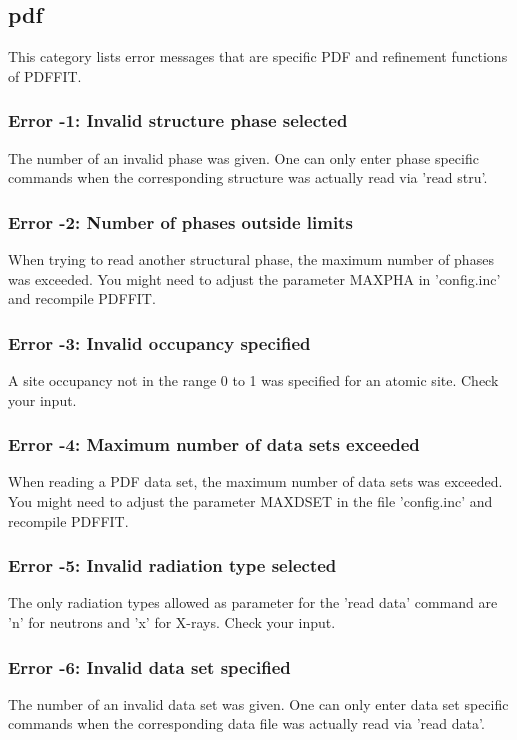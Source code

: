 \subsection*{pdf}
\par
This category lists error messages that are specific PDF 
and refinement functions of PDFFIT. 
\par
\subsubsection{Error -1: Invalid structure phase selected}
\par
The number of an invalid phase was given. One can only enter 
phase specific commands when the corresponding structure was 
actually read via 'read stru'. 
\subsubsection{Error -2: Number of phases outside limits}
\par
When trying to read another structural phase, the maximum number 
of phases was exceeded. You might need to adjust the parameter 
MAXPHA in 'config.inc' and recompile PDFFIT. 
\subsubsection{Error -3: Invalid occupancy specified}
\par
A site occupancy not in the range 0 to 1 was specified for an 
atomic site. Check your input. 
\subsubsection{Error -4: Maximum number of data sets exceeded}
\par
When reading a PDF data set, the maximum number of data sets was 
exceeded. You might need to adjust the parameter MAXDSET in the 
file 'config.inc' and recompile PDFFIT. 
\subsubsection{Error -5: Invalid radiation type selected}
\par
The only radiation types allowed as parameter for the 'read data' 
command are 'n' for neutrons and 'x' for X-rays. Check your input. 
\subsubsection{Error -6: Invalid data set specified}
\par
The number of an invalid data set was given. One can only enter 
data set specific commands when the corresponding data file was 
actually read via 'read data'. 
